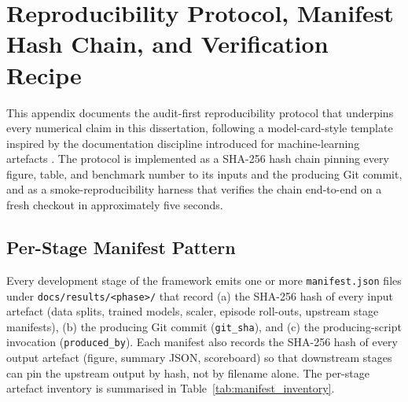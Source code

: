 
\section{Reproducibility Protocol, Manifest Hash Chain, and Verification Recipe}\label{app:repro}

This appendix documents the audit-first reproducibility protocol that underpins every numerical claim in this dissertation, following a model-card-style template inspired by the documentation discipline introduced for machine-learning artefacts \cite{Mitchell2019}. The protocol is implemented as a SHA-256 hash chain pinning every figure, table, and benchmark number to its inputs and the producing Git commit, and as a smoke-reproducibility harness that verifies the chain end-to-end on a fresh checkout in approximately five seconds.

\subsection{Per-Stage Manifest Pattern}\label{app:manifest_pattern}
Every development stage of the framework emits one or more \texttt{manifest.json} files under \texttt{docs/results/<phase>/} that record (a) the SHA-256 hash of every input artefact (data splits, trained models, scaler, episode roll-outs, upstream stage manifests), (b) the producing Git commit (\texttt{git\_sha}), and (c) the producing-script invocation (\texttt{produced\_by}). Each manifest also records the SHA-256 hash of every output artefact (figure, summary JSON, scoreboard) so that downstream stages can pin the upstream output by hash, not by filename alone. The per-stage artefact inventory is summarised in Table~\ref{tab:manifest_inventory}.

